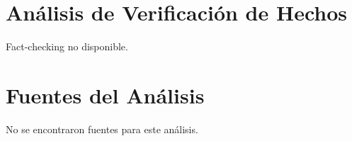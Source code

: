 \documentclass[10pt,a4paper]{article}
\begin{document}

\section*{Análisis de Verificación de Hechos}
    Fact-checking no disponible.
\vspace{1em}

\section*{Fuentes del Análisis}
    No se encontraron fuentes para este análisis.
\vspace{1em}
\end{document}
